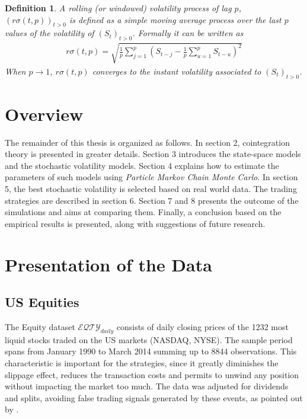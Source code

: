 \documentclass[11pt,a4,twosided,singlespacing,titlepagenumber=on]{scrreprt}
\numberwithin{equation}{chapter} %
\newtheorem{definition}[theorem]{Definition}%
\theoremstyle{remark}
\begin{document}
\begin{definition}
A rolling (or windowed) volatility process of lag $p$, $(r\sigma(t,p))_{t>0}$ is defined as a simple moving average process over the last $p$ values of the volatility of $(S_t)_{t>0}$. Formally it can be written as
\begin{align*}
r\sigma(t,p) = \sqrt{\frac{1}{p} \sum_{j=1}^p \left(S_{t-j} - \frac{1}{p}\sum_{u=1}^p S_{t-u} \right)^2}
\end{align*}
When $p \rightarrow 1$, $r\sigma(t,p)$ converges to the instant volatility associated to $(S_t)_{t>0}$. \label{windowed_volatility}
\end{definition}

\section{Overview}
The remainder of this thesis is organized as follows. In section 2, cointegration theory is presented in greater details. Section 3 introduces the state-space models and the stochastic volatility models. Section 4 explains how to estimate the parameters of such models using \textit{Particle Markov Chain Monte Carlo}. In section 5, the best stochastic volatility is selected based on real world data. The trading strategies are described in section 6. Section 7 and 8 presents the outcome of the simulations and aims at comparing them. Finally, a conclusion based on the empirical results is presented, along with suggestions of future research.

\section{Presentation of the Data}
\subsection{US Equities}
\label{sec:presentation_data}
The Equity dataset $\mathcal{EQTY}_{daily}$ consists of daily closing prices of the 1232 most liquid stocks traded on the US markets (NASDAQ, NYSE). The sample period spans from January 1990 to March 2014 summing up to 8844 observations. This characteristic is important for the strategies, since it greatly diminishes the slippage effect, reduces the transaction costs and permits to unwind any position without impacting the market too much. The data was adjusted for dividends and splits, avoiding false trading signals generated by these events, as pointed out by \cite{broussard2012}.
\end{document}

